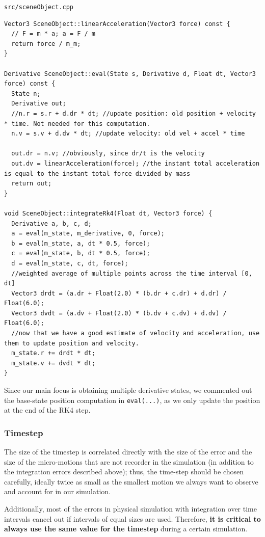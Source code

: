 \documentclass{scrartcl}
\begin{document}
\lstinline{src/sceneObject.cpp}
\begin{lstlisting}
Vector3 SceneObject::linearAcceleration(Vector3 force) const {
  // F = m * a; a = F / m
  return force / m_m;
}

Derivative SceneObject::eval(State s, Derivative d, Float dt, Vector3 force) const {
  State n;
  Derivative out;
  //n.r = s.r + d.dr * dt; //update position: old position + velocity * time. Not needed for this computation.
  n.v = s.v + d.dv * dt; //update velocity: old vel + accel * time

  out.dr = n.v; //obviously, since dr/t is the velocity
  out.dv = linearAcceleration(force); //the instant total acceleration is equal to the instant total force divided by mass
  return out;
}

void SceneObject::integrateRk4(Float dt, Vector3 force) {
  Derivative a, b, c, d;
  a = eval(m_state, m_derivative, 0, force);
  b = eval(m_state, a, dt * 0.5, force);
  c = eval(m_state, b, dt * 0.5, force);
  d = eval(m_state, c, dt, force);
  //weighted average of multiple points across the time interval [0, dt]
  Vector3 drdt = (a.dr + Float(2.0) * (b.dr + c.dr) + d.dr) / Float(6.0);
  Vector3 dvdt = (a.dv + Float(2.0) * (b.dv + c.dv) + d.dv) / Float(6.0);
  //now that we have a good estimate of velocity and acceleration, use them to update position and velocity.
  m_state.r += drdt * dt;
  m_state.v += dvdt * dt;
}
\end{lstlisting}

Since our main focus is obtaining multiple derivative states, we commented out the base-state position computation in \lstinline{eval(...)}, as we only update the position at the end of the RK4 step.

\pagebreak

\subsubsection{Timestep}
The size of the timestep is correlated directly with the size of the error and the size of the micro-motions that are not recorder in the simulation (in addition to the integration errors described above); thus, the time-step should be chosen carefully, ideally twice as small as the smallest motion we always want to observe and account for in our simulation.

Additionally, most of the errors in physical simulation with integration over time intervals cancel out if intervals of equal sizes are used. Therefore, \textbf{it is critical to always use the same value for the timestep} during a certain simulation.
  
\end{document}
